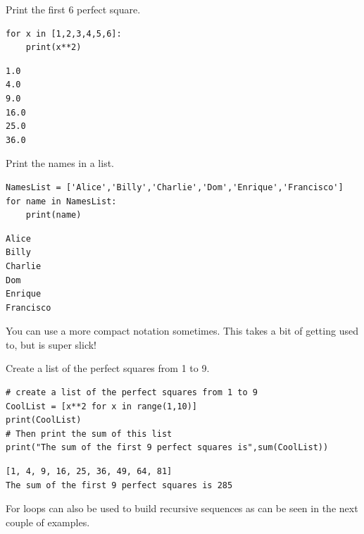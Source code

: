 \begin{example}
    Print the first 6 perfect square.

    \bcode
\begin{lstlisting}
for x in [1,2,3,4,5,6]:
    print(x**2)
\end{lstlisting}
\boutput
\begin{lstlisting}
1.0
4.0
9.0
16.0
25.0
36.0
\end{lstlisting}
\end{example}

\begin{example}
Print the names in a list.

\bcode
\begin{lstlisting}
NamesList = ['Alice','Billy','Charlie','Dom','Enrique','Francisco']
for name in NamesList:
    print(name)
\end{lstlisting}
\boutput
\begin{lstlisting}
Alice
Billy
Charlie
Dom
Enrique
Francisco
\end{lstlisting}
\end{example}

You can use a more compact notation sometimes. This takes a bit of getting used to, but is
super slick!

\begin{example}
Create a list of the perfect squares from 1 to 9.

\bcode
\begin{lstlisting}
# create a list of the perfect squares from 1 to 9
CoolList = [x**2 for x in range(1,10)]
print(CoolList)
# Then print the sum of this list
print("The sum of the first 9 perfect squares is",sum(CoolList))
\end{lstlisting}
\boutput
\begin{lstlisting}
[1, 4, 9, 16, 25, 36, 49, 64, 81]
The sum of the first 9 perfect squares is 285
\end{lstlisting}
\end{example}

For loops can also be used to build recursive sequences as can be seen in the next couple
of examples.


